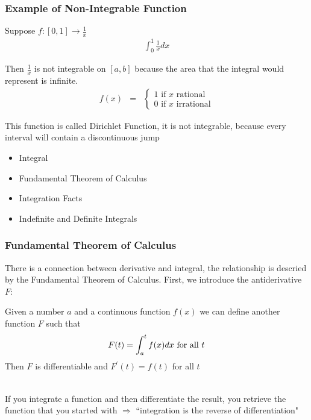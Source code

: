 \documentclass[handout]{beamer}
\numberwithin{equation}{section}
\begin{document}
\begin{frame}
\frametitle{Example of Non-Integrable Function}

Suppose $f:[0,1]\rightarrow \frac{1}{x}$ 
\begin{eqnarray}
\int_{0}^{1} \frac{1}{x} dx \nonumber 
\end{eqnarray} \pause 

Then $\frac{1}{x}$ is not integrable on $[a,b]$ because the area that the integral would represent is infinite.  \pause \\ 

\begin{eqnarray}
f(x) & = & \begin{cases}
1 \text{ if $x$ rational} \nonumber \\
0 \text{ if $x$ irrational} \end{cases} 
\end{eqnarray} \pause 

This function is called Dirichlet Function, it is not integrable, because every interval will contain a discontinuous jump 

\end{frame}



\begin{frame}

\begin{itemize}
\item \textcolor{mygray}{Integral}
\item \textcolor{myblack}{Fundamental Theorem of Calculus}
\item \textcolor{mygray}{Integration Facts}
\item \textcolor{mygray}{Indefinite and Definite Integrals}
\end{itemize}

\end{frame}



\begin{frame}
\frametitle{Fundamental Theorem of Calculus}

There is a connection between derivative and integral, the relationship is descried by the Fundamental Theorem of Calculus. \pause First, we introduce the antiderivative $F$:

\begin{theorem}
Given a number $a$ and a continuous function $f(x)$ we can define another function $F$ such that $$F(t)=\int_a^t f(x) dx \hbox{ for all } t$$
Then $F$ is differentiable and $F^\prime(t)=f(t)$ for all $t$
\end{theorem} \pause
 
\ \\If you integrate a function and then differentiate the result, you retrieve the function that you started with  $\Rightarrow$ ``integration is the reverse of differentiation"

\end{frame}
\end{document}
